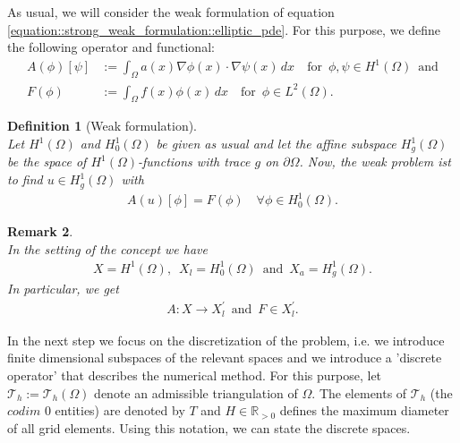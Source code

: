 \documentclass[a4paper,11pt]{article}
\numberwithin{equation}{section}
\newtheorem{definition}{Definition}[section]
\newtheorem{remark}[definition]{Remark}
\newcommand{\theoremNewline}{\hspace{1mm}\\}
\newcommand{\R}{\mathbb{R}}
\newcommand{\Tau}{\mathcal{T}}
\begin{document}
As usual, we will consider the weak formulation of equation \ref{equation::strong_weak_formulation::elliptic_pde}. For this purpose, we define the following operator and functional:
\begin{align*}
A(\phi)[\psi] &:= \int_{\Omega} a(x) \nabla \phi(x) \cdot \nabla \psi(x) \hspace{2pt} dx \quad \mbox{for} \enspace \phi,\psi \in H^1(\Omega) \enspace \mbox{and} \\
F(\phi) &:= \int_{\Omega} f(x) \phi(x) \hspace{2pt} dx \quad \mbox{for} \enspace \phi \in L^2(\Omega).
\end{align*}


\begin{definition}[Weak formulation]\label{definition::strong_weak_formulation::weak_formulation}\theoremNewline
Let $H^1(\Omega)$ and $H^1_0(\Omega)$ be given as usual and let the affine subspace $H^1_g(\Omega)$ be the space of $H^1(\Omega)$-functions with trace $g$ on $\partial \Omega$. Now, the weak problem ist to find $u \in H^1_g(\Omega)$ with
\begin{align}
\label{equation::strong_weak_formulation::analytical_problem1}
A(u)[\phi] = F(\phi) \quad \forall \phi \in H^1_0(\Omega).
\end{align}
\end{definition}

\begin{remark}\theoremNewline
In the setting of the concept we have
\begin{align*}
X=H^1(\Omega), \enspace X_l=H^1_0(\Omega) \enspace \mbox{and} \enspace X_a=H^1_g(\Omega).
\end{align*}
In particular, we get
\begin{align*}
A : X \rightarrow X_l^{\prime} \enspace \mbox{and} \enspace F \in X_l^{\prime}.
\end{align*}
\end{remark}

In the next step we focus on the discretization of the problem, i.e. we introduce finite dimensional subspaces of the relevant spaces and we introduce a 'discrete operator' that describes the numerical method. For this purpose, let $\Tau_h := \Tau_h(\Omega)$ denote an admissible triangulation of $\Omega$. The elements of $\Tau_h$ (the $codim$ 0 entities) are denoted by $T$ and $H \in \R_{>0}$ defines the maximum diameter of all grid elements. Using this notation, we can state the discrete spaces.
\end{document}
